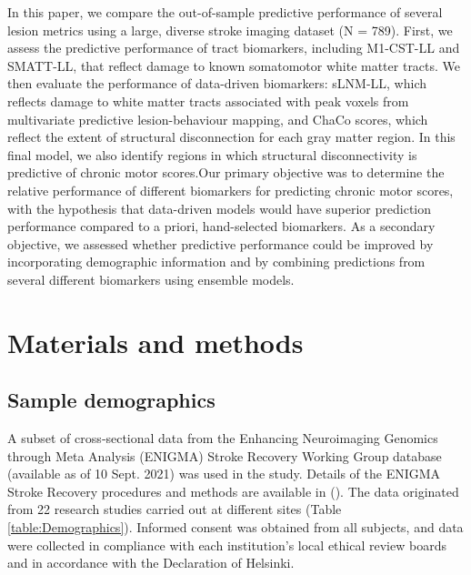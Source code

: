\documentclass[10pt]{article}
\begin{document}
In this paper, we compare the out-of-sample predictive performance of several lesion metrics using a large, diverse stroke imaging dataset (N = 789). First, we assess the predictive performance of tract biomarkers, including M1-CST-LL and SMATT-LL, that reflect damage to known somatomotor white matter tracts. We then evaluate the performance of data-driven biomarkers: sLNM-LL, which reflects damage to white matter tracts associated with peak voxels from multivariate predictive lesion-behaviour mapping, and ChaCo scores, which reflect the extent of structural disconnection for each gray matter region. In this final model, we also identify regions in which structural disconnectivity is predictive of chronic motor scores.Our primary objective was to determine the relative performance of different biomarkers for predicting chronic motor scores, with the hypothesis that data-driven models would have superior prediction performance compared to a priori, hand-selected biomarkers. As a secondary objective, we assessed whether predictive performance could be improved by incorporating demographic information and by combining predictions from several different biomarkers using ensemble models.

\section{Materials and methods}
\subsection{Sample demographics}
A subset of cross‐sectional data from the Enhancing Neuroimaging Genomics through Meta Analysis (ENIGMA) Stroke Recovery Working Group database (available as of 10 Sept. 2021) was used in the study. Details of the ENIGMA Stroke Recovery procedures and methods are available in (\cite{Liew2020-ps}). The data originated from 22 research studies carried out at different sites (Table \ref{table:Demographics}). Informed consent was obtained from all subjects, and data were collected in compliance with each institution’s local ethical review boards and in accordance with the Declaration of Helsinki.
\end{document}

